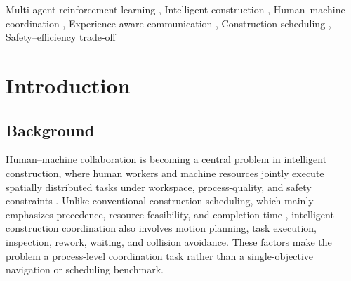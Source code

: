 \documentclass[preprint,12pt]{elsarticle}
\begin{document}
\begin{frontmatter}
\begin{abstract}
To address mechanism-attribution concerns, the revised experimental protocol adds MAPPO+Shield and IQL+Shield, greedy and greedy-reservation baselines, 8$\times$8 and 10$\times$10 scalability tests, a 20$\times$20 proof-of-scale sanity run, no-aggregation versus mean-aggregation communication ablations, and reward-sensitivity analysis. After adding the shield, the learning baselines also reach zero collision, so the revised claim is deliberately narrowed: the contribution is not that a reservation shield alone can remove conflicts, but that CCT-MARL learns a more stable safety--efficiency--communication profile under explicit communication cost. MAPPO+Shield confirms that collision removal can be obtained by post-processing, whereas the higher variance and longer-tail makespan indicate that shielded execution alone does not reproduce the complete CCT-MARL behavior. The scalability and reward-sensitivity results further examine whether the conclusion depends on the small 5$\times$5 map or on a single reward-shaping term. The implementation and experiment scripts are available at \url{https://github.com/Huskieeeee/CCT-MARL}.
\end{abstract}




\begin{keyword}
Multi-agent reinforcement learning \sep
Intelligent construction \sep
Human--machine coordination \sep
Experience-aware communication \sep
Construction scheduling \sep
Safety--efficiency trade-off
\end{keyword}

\end{frontmatter}


\section{Introduction}

\subsection{Background}

Human--machine collaboration is becoming a central problem in intelligent construction, where human workers and machine resources jointly execute spatially distributed tasks under workspace, process-quality, and safety constraints \cite{Bock2015FutureConstructionAutomation,BockLinner2016ConstructionRobots,OesterreichTeuteberg2016DigitisationConstruction,Liang2021HRCConstruction,Zhang2023HRCOnSite}. Unlike conventional construction scheduling, which mainly emphasizes precedence, resource feasibility, and completion time \cite{KolischHartmann1999RCPSP,Hartmann2000HeuristicsRCPSP,HartmannBriskorn2010RCPSPSurvey}, intelligent construction coordination also involves motion planning, task execution, inspection, rework, waiting, and collision avoidance. These factors make the problem a process-level coordination task rather than a single-objective navigation or scheduling benchmark.
\end{document}
